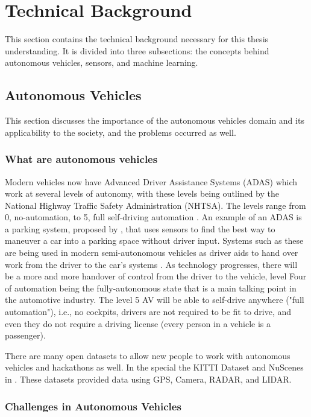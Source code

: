 \section{Technical Background}
This section contains the technical background necessary for this thesis understanding. It is divided into three subsections: the concepts behind autonomous vehicles, sensors, and machine learning.

\subsection{Autonomous Vehicles} \label{autonomous-vehicles}

This section discusses the importance of the autonomous vehicles domain and its applicability to the society, and the problems occurred as well. 

\subsubsection{What are autonomous vehicles}
Modern vehicles now have Advanced Driver Assistance Systems (ADAS)
which work at several levels of autonomy, with these levels being
outlined by the National Highway Traffic Safety Administration
(NHTSA). The levels range from 0, no-automation, to 5, full self-driving automation \cite{national2013preliminary}. An example of an ADAS is a parking system, proposed by \cite{krasner2016automatic}, that uses sensors to find the best way to maneuver a car into a parking space without driver input. Systems such as these are being used in modern semi-autonomous
vehicles as driver aids to hand over work from the driver to the
car’s systems \cite{schoning2006parklenkassistent}. As technology progresses, there will be a more
and more handover of control from the driver to the vehicle, level
Four of automation being the fully-autonomous state that is a main talking point in the automotive industry. The level 5 AV will
be able to self-drive anywhere ("full automation"), i.e., no cockpits,
drivers are not required to be fit to drive, and even they do not require a driving license (every person in a vehicle is a passenger).

There are many open datasets to allow new people to work with autonomous vehicles and hackathons as well. In the special the KITTI Dataset \cite{geiger2013vision} and NuScenes in \cite{caesar2020nuscenes}. These datasets provided data using GPS, Camera, RADAR, and LIDAR. 

\subsubsection{Challenges in Autonomous Vehicles}

